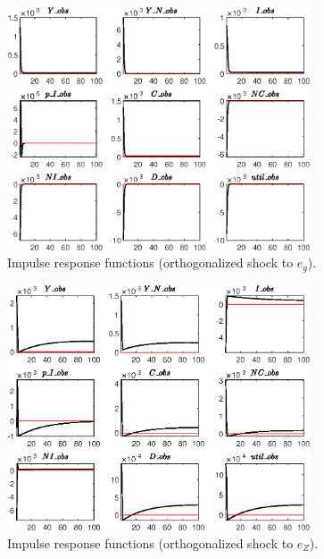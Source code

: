  
\begin{figure}[H]
\centering 
\includegraphics[width=0.80\textwidth]{BRS_util/graphs/BRS_util_IRF_e_g}
\caption{Impulse response functions (orthogonalized shock to ${e_g}$).}
\label{Fig:IRF:e_g}
\end{figure}
 
\begin{figure}[H]
\centering 
\includegraphics[width=0.80\textwidth]{BRS_util/graphs/BRS_util_IRF_e_Z}
\caption{Impulse response functions (orthogonalized shock to ${e_Z}$).}
\label{Fig:IRF:e_Z}
\end{figure}
 
